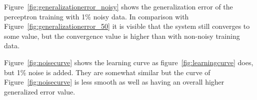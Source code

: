 Figure~\ref{fig:generalizationerror_noisy} shows the generalization error of the perceptron training with 1\% noisy data.
In comparison with Figure~\ref{fig:generalizationerror_50} it is visible that the system still converges to some value, but the convergence value is higher than with non-noisy training data. 

Figure~\ref{fig:noisecurve} shows the learning curve as figure~\ref{fig:learningcurve} does, but 1\% noise is added.
They are somewhat similar but the curve of Figure~\ref{fig:noisecurve} is less smooth as well as having an overall higher generalized error value.